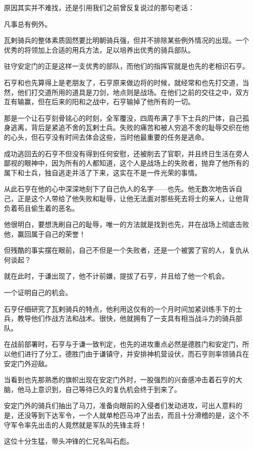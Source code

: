 \begin{multicols}{\theparacolNo}
原因其实并不难找，还是引用我们之前曾反复说过的那句老话：

凡事总有例外。

瓦剌骑兵的整体素质固然要比明朝骑兵强，但并不排除某些例外情况的出现。一个优秀的将领加上合适的用兵方法，足以培养出优秀的骑兵部队。

驻守安定门的正是这样一支优秀的部队，而他们的指挥官就是也先的老相识石亨。

石亨和也先算得上是老朋友了，石亨原来做边将的时候，就经常和也先打交道，当然，他们打交道所用的道具是刀剑，地点则是战场。在他们之前的交往之中，双方互有输赢，但在后来的阳和之战中，石亨输掉了他所有的一切。

那是一个让石亨刻骨铭心的时刻，全军覆没，四周布满了手下士兵的尸体，自己孤身逃离，背后是紧追不舍的瓦剌士兵。失败的痛苦和被人穷追不舍的耻辱交织在他的心头，但石亨没有时间去体会这些，当时他最重要的任务是逃命。

成功逃回去的石亨不但没有得到任何安慰，还被削去了官职，并且终日生活在旁人鄙视的眼神中，因为所有的人都知道，这个人是战场上的失败者，抛弃了他所有的属下和士兵，独自逃走并活了下来，这实在不是一件光荣的事情。

从此石亨在他的心中深深地刻下了自己仇人的名字——也先。他无数次地告诉自己，正是这个人带给了他失败和耻辱，让他无法面对那些死去将士的亲人，让他背负着苟且偷生着的恶名。

他很明白，要想洗刷自己的耻辱，唯一的方法就是找到也先，并在战场上彻底击败他，赢回属于自己的荣誉！

但残酷的事实摆在眼前，自己不但是一个失败者，还是一个被罢了官的人，复仇从何谈起？

就在此时，于谦出现了，他不计前嫌，提拔了石亨，并且给了他一个机会。

一个证明自己的机会。

石亨仔细研究了瓦剌骑兵的特点，他利用这仅有的一个月时间加紧训练手下的士兵，教导他们作战方法和战术。很快，他就拥有了一支具有相当战斗力的骑兵部队。

在战前部署时，石亨与于谦一致判定，也先的进攻重点必然是德胜门和安定门，所以他们进行了分工，德胜门由于谦镇守，并安排神机营设伏，而石亨则率领骑兵在安定门外迎敌。

当看到也先那熟悉的旗帜出现在安定门外时，一股强烈的兴奋感冲击着石亨的大脑，他马上意识到，自己等待已久的复仇机会终于到来了。

安定门外的骑兵们抽出了马刀，准备向眼前的入侵者们发动进攻，可出人意料的是，还没等到下达军令，一个人就单枪匹马冲了出去，而且十分滑稽的是，这个不守军令率先出击的人竟然就是军队的先锋主将！

这位十分生猛，带头冲锋的仁兄名叫石彪。


\end{multicols}
